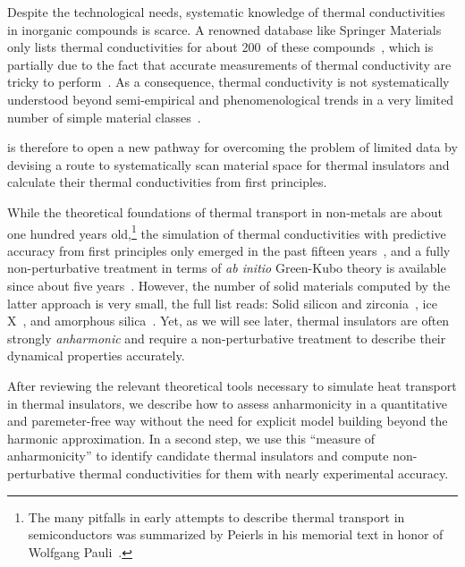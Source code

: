 Despite the technological needs, systematic knowledge of thermal conductivities in inorganic compounds is scarce. A renowned database like Springer Materials only lists thermal conductivities for about 200~of these compounds~\cite{SpringerMaterials}, which is partially due to the fact that accurate measurements of thermal conductivity are tricky to perform~\cite{wei2016}. As a consequence, thermal conductivity is not systematically understood beyond semi-empirical and phenomenological trends in a very limited number of simple material classes~\cite{morelli2006}.

 is therefore to open a new pathway for overcoming the problem of limited data by devising a route to systematically scan material space for thermal insulators and calculate their thermal conductivities from first principles. 

While the theoretical foundations of thermal transport in non-metals are about one hundred years old,\footnote{The many pitfalls in early attempts to describe thermal transport in semiconductors was summarized by Peierls in his memorial text in honor of Wolfgang Pauli~\cite{Peierls1960}.} the simulation of thermal conductivities with predictive accuracy from first principles only emerged in the past fifteen years~\cite{Broido2007}, and a fully non-perturbative treatment in terms of \emph{ab initio} Green-Kubo theory is available since about five years~\cite{Marcolongo2016,Carbogno2016}. However, the number of solid materials computed by the latter approach is very small, the full list reads: Solid silicon and zirconia~\cite{Carbogno2016}, ice X~\cite{Grasselli2020}, and amorphous silica~\cite{Marcolongo2020}. Yet, as we will see later, thermal insulators are often strongly \emph{anharmonic} and require a non-perturbative treatment to describe their dynamical properties accurately. 

 After reviewing the relevant theoretical tools necessary to simulate heat transport in thermal insulators, we describe how to assess anharmonicity in a quantitative and paremeter-free way without the need for explicit model building beyond the harmonic approximation. In a second step, we use this ``measure of anharmonicity'' to identify candidate thermal insulators and compute non-perturbative thermal conductivities for them with nearly experimental accuracy.


